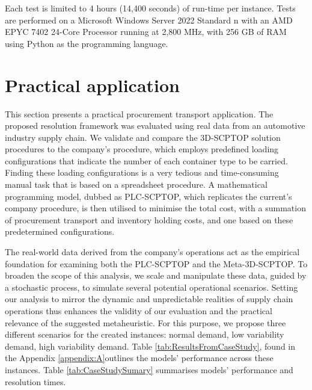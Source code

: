 Each test is limited to 4 hours (14,400 seconds) of run-time per instance. Tests are performed on a Microsoft Windows Server 2022 Standard n with an AMD EPYC 7402 24-Core Processor running at 2,800 MHz, with 256 GB of RAM using Python as the programming language.



\section{Practical application}

This section presents a practical procurement transport application. The proposed resolution framework was evaluated using real data from an automotive industry supply chain. We validate and compare the 3D-SCPTOP solution procedures to the company’s procedure, which employs predefined loading configurations that indicate the number of each container type to be carried. Finding these loading configurations is a very tedious and time-consuming manual task that is based on a spreadsheet procedure. A mathematical programming model, dubbed as PLC-SCPTOP, which replicates the current’s company procedure, is then utilised to minimise the total cost, with a summation of procurement transport and inventory holding costs, and one based on these predetermined configurations.




The real-world data derived from the company’s operations act as the empirical foundation for examining both the PLC-SCPTOP and the Meta-3D-SCPTOP. To broaden the scope of this analysis, we scale and manipulate these data, guided by a stochastic process, to simulate several potential operational scenarios. Setting our analysis to mirror the dynamic and unpredictable realities of supply chain operations thus enhances the validity of our evaluation and the practical relevance of the suggested metaheuristic. For this purpose, we propose three different scenarios for the created instances: normal demand, low variability demand, high variability demand. Table \ref{tab:ResultsFromCaseStudy}, found in the Appendix \ref{appendix:A}outlines the models’ performance across these instances. Table \ref{tab:CaseStudySumary} summarises models’ performance and resolution times.

